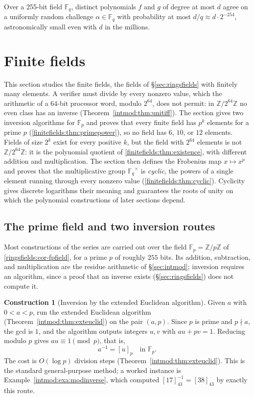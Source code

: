 \documentclass[11pt,a4paper]{article}
\theoremstyle{definition}
\newtheorem{construction}[theorem]{Construction}
\theoremstyle{remark}
\newcommand{\Z}{\ensuremath{\mathbb{Z}}}
\newcommand{\Fp}{\ensuremath{\mathbb{F}_{p}}}
\newcommand{\Fq}{\ensuremath{\mathbb{F}_{q}}}
\begin{document}
Over a 255-bit field \(\Fq\), distinct polynomials \(f\) and \(g\) of
degree at most \(d\) agree on a uniformly random challenge
\(\alpha \in \Fq\) with probability at most
\(d/q \approx d \cdot 2^{-254}\), astronomically small even with \(d\)
in the millions.

\section{Finite fields}\label{sec:finitefields}

This section studies the finite fields, the fields of
\S\ref{sec:ringsfields} with finitely many elements. A verifier must divide
by every nonzero value, which the arithmetic of a 64-bit processor word,
modulo \(2^{64}\), does not permit: in \(\Z/2^{64}\Z\) no even class has an
inverse (Theorem~\ref{intmod:thm:unitiff}). The section gives two inversion
algorithms for \(\Fp\) and proves that every finite field has \(p^k\)
elements for a prime \(p\) (\cref{finitefields:thm:primepower}), so no field
has \(6\), \(10\), or \(12\) elements. Fields of size \(2^k\) exist for every
positive \(k\), but the field with \(2^{64}\) elements is not
\(\Z/2^{64}\Z\): it is the polynomial quotient of
\cref{finitefields:thm:existence}, with different addition and
multiplication. The section then defines the Frobenius map
\(x \mapsto x^p\) and proves that the multiplicative group \(\Fq^\times\) is
\emph{cyclic}, the powers of a single element running through every nonzero
value (\cref{finitefields:thm:cyclic}).
Cyclicity gives discrete logarithms their meaning and guarantees the roots of
unity on which the polynomial constructions of later sections depend.

\subsection{The prime field and two inversion routes}
\label{finitefields:sub:inversion}

Most constructions of the series are carried out over the field
\(\Fp = \Z/p\Z\) of \cref{ringsfields:cor-fpfield}, for a prime \(p\) of
roughly \(255\) bits. Its addition, subtraction, and multiplication are the
residue arithmetic of \S\ref{sec:intmod}; inversion requires an algorithm,
since a proof that an inverse exists (\S\ref{sec:ringsfields}) does not
compute it.

\begin{construction}[Inversion by the extended Euclidean algorithm]
\label{finitefields:con:inv-euclid}
Given \(a\) with \(0 < a < p\), run the extended Euclidean algorithm
(Theorem~\ref{intmod:thm:exteuclid}) on the pair \((a, p)\). Since \(p\) is
prime and \(p \nmid a\), the gcd is \(1\), and the algorithm outputs
integers \(u, v\) with \(au + pv = 1\). Reducing modulo \(p\) gives
\(au \equiv 1 \pmod{p}\), that is,
\[
a^{-1} = [u]_p \quad\text{in } \Fp .
\]
The cost is \(O(\log p)\) division steps
(Theorem~\ref{intmod:thm:exteuclid}). This is the standard general-purpose
method; a worked instance is Example~\ref{intmod:exa:modinverse}, which
computed \([17]_{43}^{-1} = [38]_{43}\) by exactly this route.
\end{construction}
\end{document}
